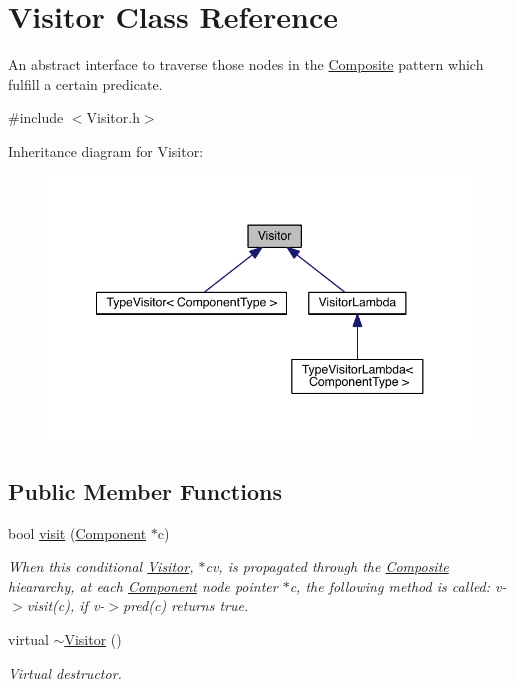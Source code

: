 \hypertarget{classVisitor}{\section{Visitor Class Reference}
\label{classVisitor}
}


An abstract interface to traverse those nodes in the \hyperlink{classComposite}{Composite} pattern which fulfill a certain predicate.  




{\ttfamily \#include $<$Visitor.\+h$>$}



Inheritance diagram for Visitor\+:\nopagebreak
\begin{figure}[H]
\begin{center}
\leavevmode
\includegraphics[width=348pt]{classVisitor__inherit__graph}
\end{center}
\end{figure}
\subsection*{Public Member Functions}
\begin{DoxyCompactItemize}
\item 
bool \hyperlink{classVisitor_a3f8ea7ad6aa61e99d8d1bc0576bdf23c}{visit} (\hyperlink{classComponent}{Component} $\ast$c)
\begin{DoxyCompactList}\small\item\em When this conditional \hyperlink{classVisitor}{Visitor}, $\ast$cv, is propagated through the \hyperlink{classComposite}{Composite} hieararchy, at each \hyperlink{classComponent}{Component} node pointer $\ast$c, the following method is called\+: v-\/$>$visit(c), if v-\/$>$pred(c) returns true. \end{DoxyCompactList}\item 
virtual \hyperlink{classVisitor_a2c9cc57ee3a518a193ea88384cbf3937}{$\sim$\+Visitor} ()
\begin{DoxyCompactList}\small\item\em Virtual destructor. \end{DoxyCompactList}\end{DoxyCompactItemize}
